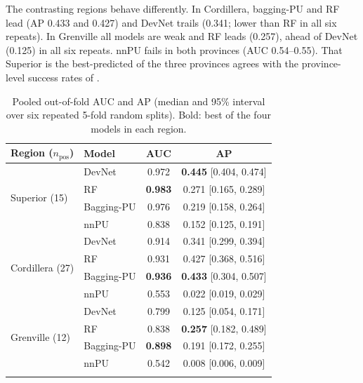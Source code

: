 \documentclass[pdflatex,sn-apa]{sn-jnl}
\begin{document}
The contrasting regions behave differently. In Cordillera, bagging-PU and RF lead (AP 0.433 and 0.427) and DevNet trails (0.341; lower than RF in all six repeats). In Grenville all models are weak and RF leads (0.257), ahead of DevNet (0.125) in all six repeats. nnPU fails in both provinces (AUC 0.54--0.55). That Superior is the best-predicted of the three provinces agrees with the province-level success rates of \citet{Parsa2024}.

\begin{table}[t]
\caption{Pooled out-of-fold AUC and AP (median and 95\% interval over six repeated 5-fold random splits). Bold: best of the four models in each region.}\label{tab:benchmark}
\footnotesize
\begin{tabular*}{\textwidth}{@{\extracolsep\fill}llcc}
\toprule
Region ($n_{\mathrm{pos}}$) & Model & AUC & AP \\
\midrule
\multirow{4}{*}{Superior (15)} & DevNet & 0.972 & \textbf{0.445} [0.404, 0.474] \\
 & RF & \textbf{0.983} & 0.271 [0.165, 0.289] \\
 & Bagging-PU & 0.976 & 0.219 [0.158, 0.264] \\
 & nnPU & 0.838 & 0.152 [0.125, 0.191] \\
\midrule
\multirow{4}{*}{Cordillera (27)} & DevNet & 0.914 & 0.341 [0.299, 0.394] \\
 & RF & 0.931 & 0.427 [0.368, 0.516] \\
 & Bagging-PU & \textbf{0.936} & \textbf{0.433} [0.304, 0.507] \\
 & nnPU & 0.553 & 0.022 [0.019, 0.029] \\
\midrule
\multirow{4}{*}{Grenville (12)} & DevNet & 0.799 & 0.125 [0.054, 0.171] \\
 & RF & 0.838 & \textbf{0.257} [0.182, 0.489] \\
 & Bagging-PU & \textbf{0.898} & 0.191 [0.172, 0.255] \\
 & nnPU & 0.542 & 0.008 [0.006, 0.009] \\
\botrule
\end{tabular*}
\end{table}
\end{document}
